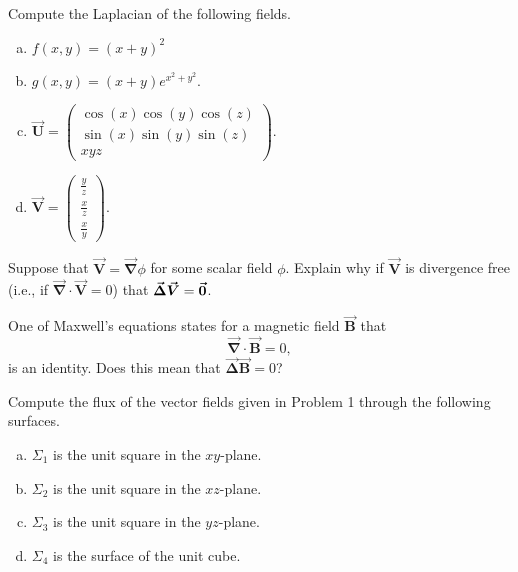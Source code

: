 \documentclass[12pt]{article} %
\newcommand{\grad}{\boldsymbol{\vec{\nabla}}}
\newcommand{\vecfieldV}{\boldsymbol{\vec{V}}}
\newcommand{\vecfieldU}{\boldsymbol{\vec{U}}}
\newcommand{\veclaplace}{\boldsymbol{\vec{\Delta}}}
\newcommand{\vecfieldB}{\boldsymbol{\vec{B}}}
\begin{document}
\begin{problem}
Compute the Laplacian of the following fields.
\begin{multicols}{2}
\begin{enumerate}[(a)]
    \item $f(x,y) = (x+y)^2$
    \item $g(x,y) = (x+y)e^{x^2+y^2}$.
    \item $\vecfieldU = \begin{pmatrix} \cos(x)\cos(y)\cos(z) \\ \sin(x)\sin(y)\sin(z) \\ xyz \end{pmatrix}$.
    \item $\vecfieldV = \begin{pmatrix} \frac{y}{z} \\ \frac{x}{z} \\ \frac{x}{y} \end{pmatrix}$.
\end{enumerate}
\end{multicols}
\end{problem}

\begin{problem}
    Suppose that $\vecfieldV = \grad \phi$ for some scalar field $\phi$.  Explain why if $\vecfieldV$ is divergence free (i.e., if $\grad \cdot \vecfieldV=0$) that $\veclaplace \vecfieldV = \zerovec$.
\end{problem}

\begin{problem}
    One of Maxwell's equations states for a magnetic field $\vecfieldB$ that
    \[
    \grad \cdot \vecfieldB = 0,
    \]
    is an identity.  Does this mean that $\veclaplace \vecfieldB = 0$? 
\end{problem}

\begin{problem}
Compute the flux of the vector fields given in Problem 1 through the following surfaces.
\begin{multicols}{2}
\begin{enumerate}[(a)]
    \item $\Sigma_1$ is the unit square in the $xy$-plane.  
    \item $\Sigma_2$ is the unit square in the $xz$-plane.
    \item $\Sigma_3$ is the unit square in the $yz$-plane.
    \item $\Sigma_4$ is the surface of the unit cube.
\end{enumerate}
\end{multicols}
\end{problem}
\end{document}
